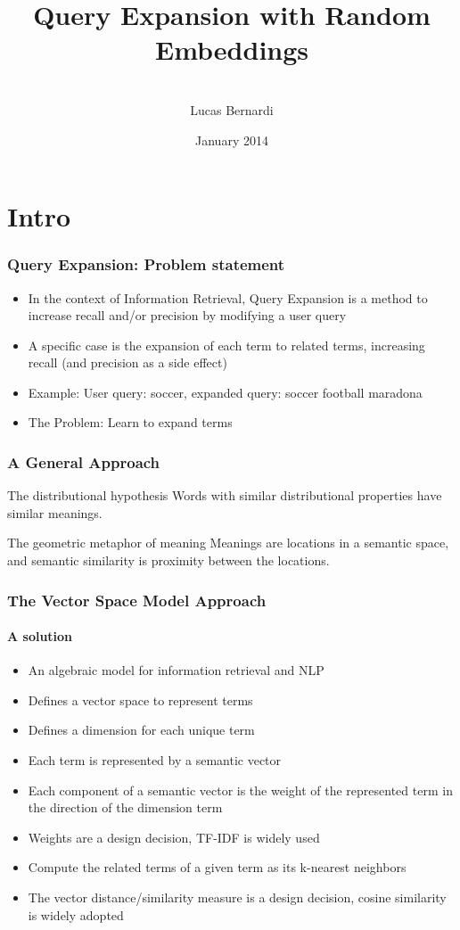 \documentclass{beamer}
\title[RI]{Query Expansion with Random Embeddings}
\author[]{\\[4mm]Lucas Bernardi}
\date{January 2014}
\begin{document}
\frame{\titlepage}

\frame{\tableofcontents}

\section{Intro}

\begin{frame}
	\frametitle{Query Expansion: Problem statement}
	\bigskip
	\begin{itemize}
	\item In the context of Information Retrieval, Query Expansion is a method to increase recall and/or precision by modifying a user query
  \item A specific case is the expansion of each term to related terms, increasing recall (and precision as a side effect)
  \item Example: User query: soccer, expanded query: soccer football maradona
  \item  The Problem: Learn to expand terms
	\end{itemize}
\end{frame}

\begin{frame}
	\frametitle{A General Approach}
	\begin{block}{The distributional hypothesis}
    Words with similar distributional properties have similar meanings.
  \end{block}
\bigskip
	\begin{block}{The geometric metaphor of meaning}
  Meanings are locations in a semantic space, and semantic similarity is proximity between the locations.
  \end{block}
\end{frame}


\begin{frame}
	\frametitle{The Vector Space Model Approach}
	\framesubtitle{A solution}
  \begin{itemize}
    \item	An algebraic model for information retrieval and NLP
    \item	Defines a vector space to represent terms
    \item	Defines a dimension for each unique term
    \item	Each term is represented by a semantic vector
    \item Each component of a semantic vector is the weight of the represented term in the direction of the dimension term
    \item Weights are a design decision, TF-IDF is widely used
    \item Compute the related terms of a given term as its k-nearest neighbors
    \item The vector distance/similarity measure is a design decision, cosine similarity is widely adopted
  \end{itemize}
\end{frame}
\end{document}
